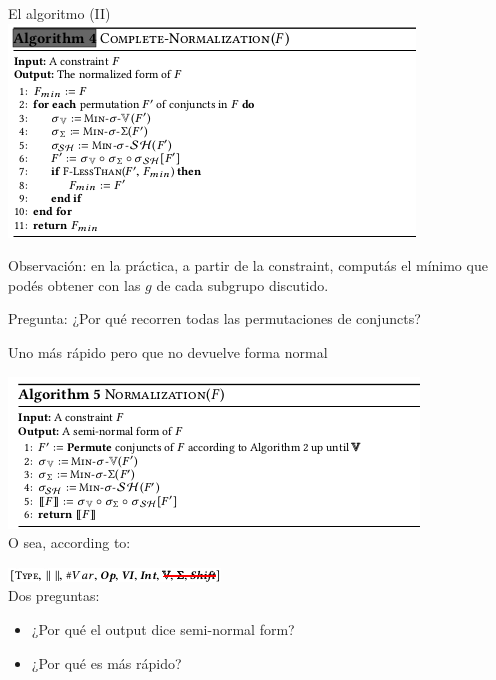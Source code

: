 \documentclass[10pt]{beamer}
\begin{document}
\begin{frame}{El algoritmo (II)}
\includegraphics[scale=1]{alg4.png}

Observación: en la práctica, a partir de la constraint, computás el mínimo que podés obtener con las $g$ de cada subgrupo discutido.


Pregunta: ¿Por qué recorren todas las permutaciones de conjuncts?
\end{frame}

\begin{frame}{Uno más rápido pero que no devuelve forma normal}

\includegraphics[scale=1]{alg5.png}\\

O sea, according to:

\includegraphics[scale=1]{alg2ac.png}\\

Dos preguntas:
\begin{itemize}
	\item ¿Por qué el output dice semi-normal form?
	\item ¿Por qué es más rápido?
\end{itemize}
\end{frame}
\end{document}
